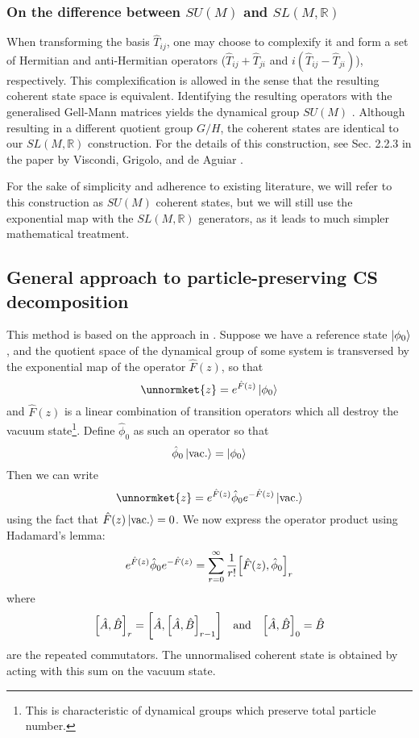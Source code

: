 \subsubsection{On the difference between $SU(M)$ and $SL(M,\mathbb{R})$}
	When transforming the basis $\hat{T}_{ij}$, one may choose to complexify it and form a set of Hermitian and anti-Hermitian operators ($\hat{T}_{ij}+\hat{T}_{ji}$ and $i(\hat{T}_{ij}-\hat{T}_{ji})$), respectively. This complexification is allowed in the sense that the resulting coherent state space is equivalent. Identifying the resulting operators with the generalised Gell-Mann matrices yields the dynamical group $SU(M)$ \cite{gellmann}. Although resulting in a different quotient group $G/H$, the coherent states are identical to our $SL(M,\mathbb{R})$ construction. For the details of this construction, see Sec. 2.2.3 in the paper by Viscondi, Grigolo, and de Aguiar \cite{aguiar}.
	
	For the sake of simplicity and adherence to existing literature, we will refer to this construction as $SU(M)$ coherent states, but we will still use the exponential map with the $SL(M,\mathbb{R})$ generators, as it leads to much simpler mathematical treatment.

\subsection{General approach to particle-preserving CS decomposition} \label{sec:general_decomposition}
	This method is based on the approach in \cite[App. E]{buonsante}. Suppose we have a reference state $\ket{\phi_0}$, and the quotient space of the dynamical group of some system is transversed by the exponential map of the operator $\hat{F}(z)$, so that
	\begin{equation}
	\unnormket{z}=e^{\hat{F}(z)}\ket{\phi_0}
	\end{equation}
	and $\hat{F}(z)$ is a linear combination of transition operators which all destroy the vacuum state\footnote{This is characteristic of dynamical groups which preserve total particle number.}. Define $\hat{\phi}_0$ as such an operator so that
	\begin{equation}
	\hat{\phi}_0\ket{\rm vac.} = \ket{\phi_0}
	\end{equation}
	Then we can write
	\begin{equation}
	\unnormket{z}=e^{\hat{F}(z)}\hat{\phi}_0e^{-\hat{F}(z)}\ket{\rm vac.}
	\end{equation}
	using the fact that $\hat{F}(z)\ket{\rm vac.}=0$. We now express the operator product using Hadamard's lemma:
	\begin{equation}\label{eq:hadamard sum}
	e^{\hat{F}(z)}\hat{\phi}_0e^{-\hat{F}(z)}=\sum_{r=0}^\infty \frac{1}{r!}\comm{\hat{F}(z)}{\hat{\phi}_0}_r
	\end{equation}
	where
	\begin{equation}
	\comm{\hat{A}}{\hat{B}}_r=\comm{\hat{A}}{\comm{\hat{A}}{\hat{B}}_{r-1}}\qq{and}\comm{\hat{A}}{\hat{B}}_0=\hat{B}
	\end{equation}
	are the repeated commutators. The unnormalised coherent state is obtained by acting with this sum on the vacuum state.

